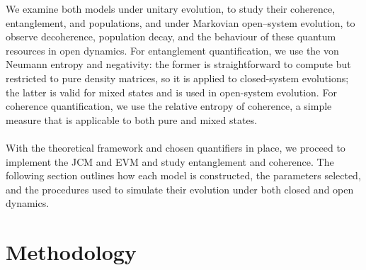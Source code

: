 \documentclass[11pt]{article}
\begin{document}
We examine both models under unitary evolution, to study their coherence, entanglement, and populations, and under Markovian open--system evolution, to observe decoherence, population decay, and the behaviour of these quantum resources in open dynamics. For entanglement quantification, we use the von Neumann entropy and negativity: the former is straightforward to compute but restricted to pure density matrices, so it is applied to closed-system evolutions; the latter is valid for mixed states and is used in open-system evolution. For coherence quantification, we use the relative entropy of coherence, a simple measure that is applicable to both pure and mixed states.\\
\\
With the theoretical framework and chosen quantifiers in place, we proceed to implement the JCM and EVM and study entanglement and coherence. The following section outlines how each model is constructed, the parameters selected, and the procedures used to simulate their evolution under both closed and open dynamics. 
\newpage
\section{Methodology} \label{sec:method}
\end{document}
